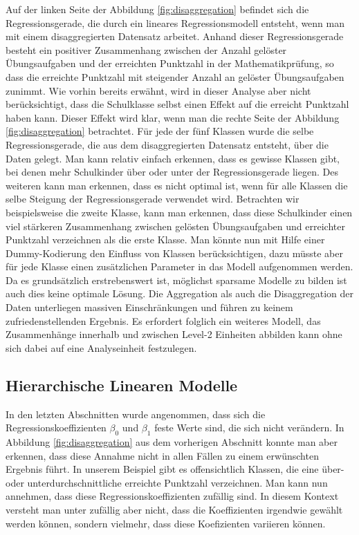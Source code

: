 \documentclass[12pt]{article}\usepackage[]{graphicx}\usepackage[]{color}
\begin{document}
Auf der linken Seite der Abbildung \ref{fig:disaggregation} befindet sich die Regressionsgerade, die durch ein lineares Regressionsmodell entsteht, wenn man mit einem disaggregierten Datensatz arbeitet. Anhand dieser Regressionsgerade besteht ein positiver Zusammenhang zwischen der Anzahl gelöster Übungsaufgaben und der erreichten Punktzahl in der Mathematikprüfung, so dass die erreichte Punktzahl mit steigender Anzahl an gelöster Übungsaufgaben zunimmt. Wie vorhin bereits erwähnt, wird in dieser Analyse aber nicht berücksichtigt, dass die Schulklasse selbst einen Effekt auf die erreicht Punktzahl haben kann. Dieser Effekt wird klar, wenn man die rechte Seite der Abbildung \ref{fig:disaggregation} betrachtet. Für jede der fünf Klassen wurde die selbe Regressionsgerade, die aus dem disaggregierten Datensatz entsteht, über die Daten gelegt. Man kann relativ einfach erkennen, dass es gewisse Klassen gibt, bei  denen mehr Schulkinder über oder unter der Regressionsgerade liegen. Des weiteren kann man erkennen, dass es nicht optimal ist, wenn für alle Klassen die selbe Steigung der Regressionsgerade verwendet wird. Betrachten wir beispielsweise die zweite Klasse, kann man erkennen, dass diese Schulkinder einen viel stärkeren Zusammenhang zwischen gelösten Übungsaufgaben und erreichter Punktzahl verzeichnen als die erste Klasse. Man könnte nun mit Hilfe einer Dummy-Kodierung den Einfluss von Klassen berücksichtigen, dazu müsste aber für jede Klasse einen zusätzlichen Parameter in das Modell aufgenommen werden. Da es grundsätzlich erstrebenswert ist, möglichst sparsame Modelle zu bilden ist auch dies keine optimale Lösung. Die Aggregation als auch die Disaggregation der Daten unterliegen massiven Einschränkungen und führen zu keinem zufriedenstellenden Ergebnis. Es erfordert folglich ein weiteres Modell, das Zusammenhänge innerhalb und zwischen Level-2 Einheiten abbilden kann ohne sich dabei auf eine Analyseinheit festzulegen.

\subsection{Hierarchische Linearen Modelle}
In den letzten Abschnitten wurde angenommen, dass sich die Regressionskoeffizienten $\beta_0$ und $\beta_1$ feste Werte sind, die sich nicht verändern. In Abbildung \ref{fig:disaggregation} aus dem vorherigen Abschnitt konnte man aber erkennen, dass diese Annahme nicht in allen Fällen zu einem erwünschten Ergebnis führt. In unserem Beispiel gibt es offensichtlich Klassen, die eine über- oder unterdurchschnittliche erreichte Punktzahl verzeichnen. Man kann nun annehmen, dass diese Regressionskoeffizienten zufällig sind. In diesem Kontext versteht man unter zufällig aber nicht, dass die Koeffizienten irgendwie gewählt werden können, sondern vielmehr, dass diese Koefizienten variieren können. 
\end{document}
